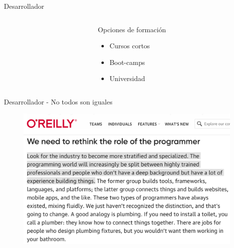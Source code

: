 \documentclass[aspectratio=169]{beamer}
\begin{document}
\begin{frame}[fragile,c]{Desarrollador}

\begin{columns}[T] %
	     \begin{column}[T]{7cm} %

	     \end{column}
	     \begin{column}[T]{4cm} %
             Opciones de formación
			\begin{itemize}
    			\item Cursos cortos
                \item Boot-camps
                \item Universidad

			\end{itemize}

	     \end{column}
     \end{columns}

\end{frame}


\begin{frame}[fragile,c]{Desarrollador - No todos son iguales}

 \begin{figure}
        \centering
        \includegraphics[width=0.9\linewidth]{Images/oreilly}
    \end{figure}
\end{frame}
\end{document}
